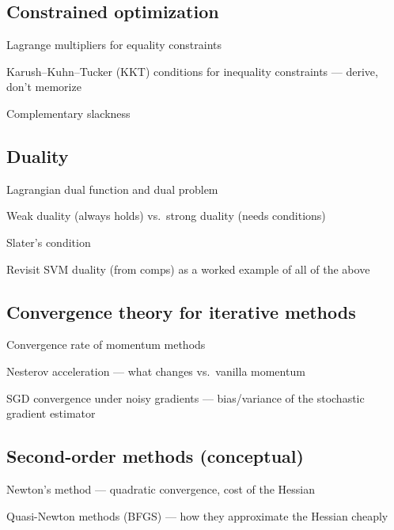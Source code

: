 \documentclass[11pt]{article}
\begin{document}
\subsection{Constrained optimization}
\begin{tasklist}
    \item Lagrange multipliers for equality constraints
    \item Karush--Kuhn--Tucker (KKT) conditions for inequality constraints — derive, don't memorize
    \item Complementary slackness
\end{tasklist}

\subsection{Duality}
\begin{tasklist}
    \item Lagrangian dual function and dual problem
    \item Weak duality (always holds) vs.\ strong duality (needs conditions)
    \item Slater's condition
    \item Revisit SVM duality (from comps) as a worked example of all of the above
\end{tasklist}

\subsection{Convergence theory for iterative methods}
\begin{tasklist}
    \item Convergence rate of momentum methods
    \item Nesterov acceleration — what changes vs.\ vanilla momentum
    \item SGD convergence under noisy gradients — bias/variance of the stochastic gradient estimator
\end{tasklist}

\subsection{Second-order methods (conceptual)}
\begin{tasklist}
    \item Newton's method — quadratic convergence, cost of the Hessian
    \item Quasi-Newton methods (BFGS) — how they approximate the Hessian cheaply
\end{tasklist}
\end{document}

